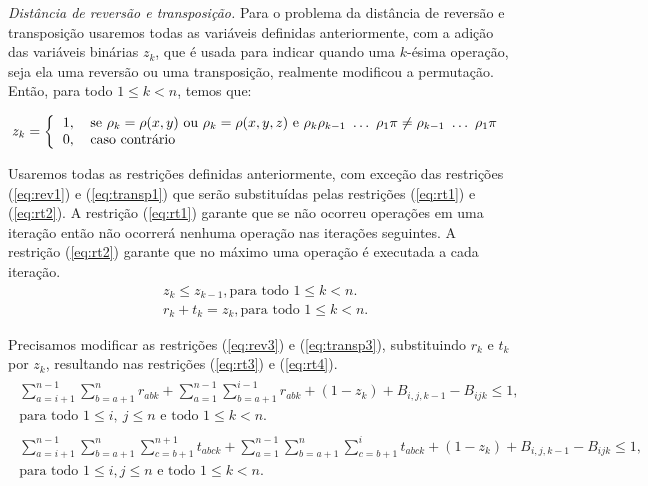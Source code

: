 \textit{Distância de reversão e transposição.}
Para o problema da distância de reversão e transposição usaremos todas
as variáveis definidas anteriormente, com a adição das variáveis
binárias $z_{k}$, que é usada para indicar quando uma $k$-ésima
operação, seja ela uma reversão ou uma transposição, realmente
modificou a permutação. Então, para todo $1 \le k < n$, temos que:

\[
z_{k} = \left \{ 
  \begin{tabular}{ll} 
  1, & se $\rho_{k} = \rho(x,y)$ ou $\rho_{k} = \rho(x,y,z)$ e
  $\rho_{k} \rho_{k-1}~\ldots~\rho_{1} \pi \neq \rho_{k-1}~\ldots~\rho_{1} \pi$\\
  0, & caso contrário
  \end{tabular} \right .
\]

Usaremos todas as restrições definidas anteriormente, com exceção das
restrições (\ref{eq:rev1}) e (\ref{eq:transp1}) que serão substituídas
pelas restrições (\ref{eq:rt1}) e (\ref{eq:rt2}). A restrição
(\ref{eq:rt1}) garante que se não ocorreu operações em uma iteração
então não ocorrerá nenhuma operação nas iterações seguintes. A
restrição (\ref{eq:rt2}) garante que no máximo uma operação é
executada a cada iteração.
\begin{align}
  &z_{k} \le z_{k-1}, \text{para todo $1 \le k <
    n$}. \label{eq:rt1} \\ 
  &r_{k} + t_{k} = z_{k} , \text{para todo
    $1 \le k < n$}. \label{eq:rt2}
\end{align}

Precisamos modificar as restrições (\ref{eq:rev3}) e
(\ref{eq:transp3}), substituindo $r_{k}$ e $t_{k}$ por $z_{k}$,
resultando nas restrições (\ref{eq:rt3}) e (\ref{eq:rt4}).
\begin{align}
  \begin{split}
    \sum_{a=i+1}^{n-1}\sum_{b=a+1}^{n} r_{abk} +
    \sum_{a=1}^{n-1}\sum_{b=a+1}^{i-1} r_{abk} +
    (1 - z_{k}) + B_{i,j,k-1} - B_{ijk} \le 1, \\
    \text{para todo $1 \le i,~j \le n$ e todo $1 \le k < n$}.
  \end{split} \label{eq:rt3} \\
  \begin{split} 
    \sum_{a=i+1}^{n-1}\sum_{b=a+1}^{n}\sum_{c=b+1}^{n+1} t_{abck}
    + \sum_{a=1}^{n-1}\sum_{b=a+1}^{n}\sum_{c=b+1}^{i} t_{abck} + (1 -
    z_{k}) + B_{i,j,k-1} - B_{ijk} \le 1, \\
    \text{para todo $1 \le i, j \le n$ e todo $1 \le k <
    n$}.
  \end{split} \label{eq:rt4}
\end{align}

